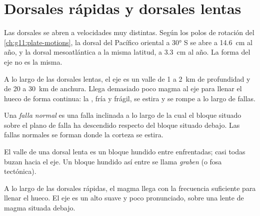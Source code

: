 \section{Dorsales rápidas y dorsales lentas}

Las dorsales se abren a velocidades muy distintas. Según los polos de rotación
del \cref{ch:g11:plate-motions}, la dorsal del Pacífico oriental a \ang{30} S
se abre a \qty{14.6}{cm} al año, y la dorsal mesoatlántica a la misma latitud,
a \qty{3.3}{cm} al año. La forma del eje no es la misma.

A lo largo de las dorsales lentas, el eje es un valle de 1 a \qty{2}{km} de
profundidad y de 20 a \qty{30}{km} de anchura. Llega demasiado poco magma al
eje para llenar el hueco de forma continua: la , fría y frágil, se
estira y se rompe a lo largo de fallas.

\begin{definition}\label{def:g11:ocean-ridges:normal-fault}
Una \emph{falla normal} es una falla inclinada a lo largo
de la cual el bloque situado sobre el plano de falla ha descendido respecto
del bloque situado debajo. Las fallas normales se forman donde la corteza se
estira.
\end{definition}

El valle de una dorsal lenta es un bloque hundido entre 
enfrentadas; casi todas buzan hacia el eje. Un bloque hundido así entre  se llama \emph{graben} (o fosa tectónica).

A lo largo de las dorsales rápidas, el magma llega con la frecuencia
suficiente para llenar el hueco. El eje es un alto suave y poco pronunciado,
sobre una lente de magma situada debajo.

